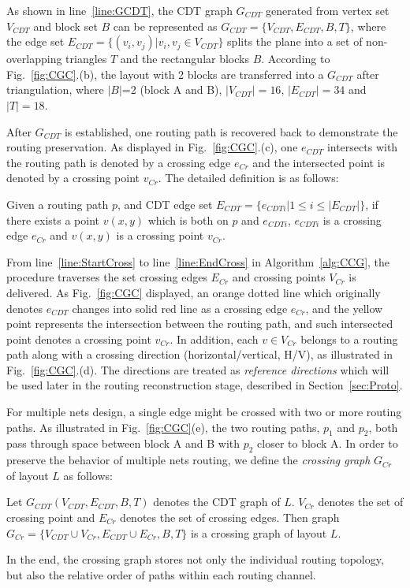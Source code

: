       As shown in line~\ref{line:GCDT}, the CDT graph $G_{CDT}$ generated from vertex set $V_{CDT}$ and block set $B$ can be represented as $G_{CDT} = \{V_{CDT},E_{CDT},B,T\}$, where the edge set $E_{CDT} = \{(v_i,v_j)|v_i,v_j\in V_{CDT}\}$ splits the plane into a set of non-overlapping triangles $T$ and the rectangular blocks $B$. According to Fig.~\ref{fig:CGC}.(b), the layout with 2 blocks are transferred into a $G_{CDT}$ after triangulation, where $|B|$=2 (block A and B), $|V_{CDT}|=16$, $|E_{CDT}|=34$ and $|T|=18$.


      After $G_{CDT}$ is established, one routing path is recovered back to demonstrate the routing preservation. As displayed in Fig.~\ref{fig:CGC}.(c), one $e_{CDT}$ intersects with the routing path is denoted by a crossing edge $e_{Cr}$ and the intersected point is denoted by a crossing point $v_{Cr}$. The detailed definition is as follows:

       
      \begin{defi}\label{defi:CrossingPoint}
        Given a routing path $p$, and CDT edge set $E_{CDT}= \{e_{CDTi}| 1 \leq i\leq|E_{CDT}|\}$, if there exists a point $v(x,y)$ which is both on $p$ and $e_{CDTi}$, $e_{CDTi}$ is a crossing edge $e_{Cr}$ and $v(x,y)$ is a crossing point $v_{Cr}$.
      \end{defi}

      From line~\ref{line:StartCross} to line~\ref{line:EndCross} in Algorithm~\ref{alg:CCG}, the procedure traverses the set crossing edges $E_{Cr}$ and crossing points $V_{Cr}$ is delivered. As Fig.~\ref{fig:CGC} displayed, an orange dotted line which originally denotes $e_{CDT}$ changes into solid red line as a crossing edge $e_{Cr}$, and the yellow point represents the intersection between the routing path, and such intersected point denotes a crossing point $v_{Cr}$. In addition, each $v \in V_{Cr}$ belongs to a routing path along with a crossing direction (horizontal/vertical, H/V), as illustrated in Fig.~\ref{fig:CGC}.(d). The directions are treated as {\it reference directions} which will be used later in the routing reconstruction stage, described in Section~\ref{sec:Proto}. 



      For multiple nets design, a single edge might be crossed with two or more routing paths. As illustrated in Fig.~\ref{fig:CGC}(e), the two routing paths, $p_1$ and $p_2$, both pass through space between block A and B with $p_2$ closer to block A. In order to preserve the behavior of multiple nets routing, we define the {\it crossing graph} $G_{Cr}$ of layout $L$ as follows:
      \vspace{0.2cm}
      \begin{defi}\label{defi:CrossGraph}
        Let $G_{CDT}(V_{CDT},E_{CDT},B,T)$ denotes the CDT graph of $L$. $V_{Cr}$ denotes the set of crossing point and $E_{Cr}$ denotes the set of crossing edges. Then graph $G_{Cr} = \{V_{CDT} \cup V_{Cr},E_{CDT} \cup E_{Cr},B,T\}$ is a crossing graph of layout $L$. 
      \end{defi}
      \vspace{0.2cm}
      In the end, the crossing graph stores not only the individual routing topology, but also the relative order of paths within each routing channel.


